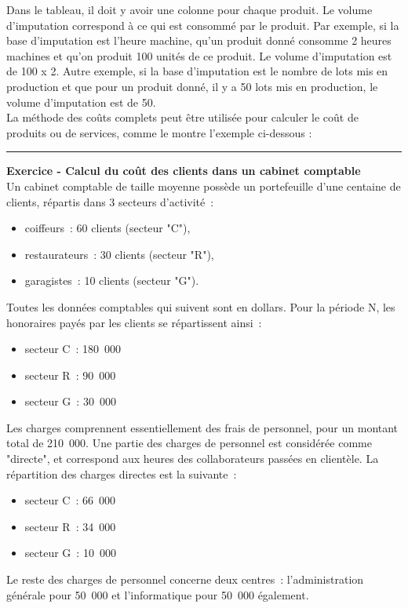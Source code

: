 \documentclass{kaobook}
\begin{document}
Dans le tableau, il doit y avoir une colonne pour chaque produit. Le volume d'imputation correspond à ce qui est consommé par le produit. Par exemple, si la base d'imputation est l'heure machine, qu'un produit donné consomme 2 heures machines et qu'on produit 100 unités de ce produit. Le volume d'imputation est de 100 x 2. Autre exemple, si la base d'imputation est le nombre de lots mis en production et que pour un produit donné, il y a 50 lots mis en production, le volume d'imputation est de 50.\\

La méthode des coûts complets peut être utilisée pour calculer le coût de produits ou de services, comme le montre l'exemple ci-dessous :\\

\noindent\rule{\textwidth}{0.5pt}
\textbf{Exercice - Calcul du coût des clients dans un cabinet comptable}\\
Un cabinet comptable de taille moyenne possède un portefeuille d'une centaine de clients, répartis dans 3 secteurs d'activité :\\
\begin{itemize}
\item coiffeurs : 60 clients (secteur "C"),\\
\item restaurateurs : 30 clients (secteur "R"),\\
\item garagistes : 10 clients (secteur "G").\\
\end{itemize}
Toutes les données comptables qui suivent sont en dollars. Pour la période N, les honoraires payés par les clients se répartissent ainsi :\\
\begin{itemize}
\item secteur C : 180 000\\
\item secteur R : 90 000\\
\item secteur G : 30 000\\
\end{itemize}
Les charges comprennent essentiellement des frais de personnel, pour un montant total de 210 000. Une partie des charges de personnel est considérée comme "directe", et correspond aux heures des collaborateurs passées en clientèle. La répartition des charges directes est la suivante :\\
\begin{itemize}
\item secteur C : 66 000\\
\item secteur R : 34 000\\
\item secteur G : 10 000\\
\end{itemize}
Le reste des charges de personnel concerne deux centres : l'administration générale pour 50 000 et l'informatique pour 50 000 également.\\
\end{document}
